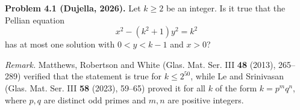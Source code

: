 \textbf{Problem 4.1 (Dujella, 2026).} Let $k \geqslant 2$ be an integer. Is it true that the Pellian equation
\[
x^2 - (k^2+1)y^2 = k^2
\]
has at most one solution with $0<y<k-1$ and $x>0$?

\medskip

\textit{Remark.} Matthews, Robertson and White (Glas. Mat. Ser. III \textbf{48} (2013), 265--289) verified that the statement is true for $k \leqslant 2^{50}$, while Le and Srinivasan (Glas. Mat. Ser. III \textbf{58} (2023), 59--65) proved it for all $k$ of the form $k=p^mq^n$, where $p,q$ are distinct odd primes and $m,n$ are positive integers.
